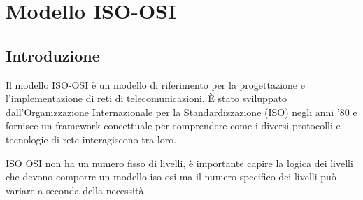 \section{Modello ISO-OSI}
\subsection*{Introduzione}
Il modello ISO-OSI è un modello di riferimento per la progettazione e l'implementazione di reti di telecomunicazioni. È stato sviluppato dall'Organizzazione Internazionale per la Standardizzazione (ISO) negli anni '80 e fornisce un framework concettuale per comprendere come i diversi protocolli e tecnologie di rete interagiscono tra loro.

ISO OSI non ha un numero fisso di livelli, è importante capire la logica dei livelli che devono comporre un modello iso osi ma il numero specifico dei livelli può variare a seconda della necessità.

